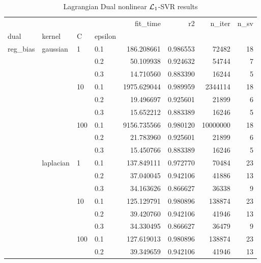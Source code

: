 \begin{table}[H]
\centering
\caption{Lagrangian Dual nonlinear $\protect \mathcal{L}_1$-SVR results}
\label{nonlinear_lagrangian_dual_l1_svr_cv_results}
\begin{tabular}{llllrrrr}
\toprule
           &           &     &     &     fit\_time &        r2 &    n\_iter &  n\_sv \\
dual & kernel & C & epsilon &              &           &           &       \\
\midrule
reg\_bias & gaussian & 1   & 0.1 &   186.208661 &  0.986553 &     72482 &    18 \\
           &           &     & 0.2 &    50.109938 &  0.924632 &     54744 &     7 \\
           &           &     & 0.3 &    14.710560 &  0.883390 &     16244 &     5 \\
           &           & 10  & 0.1 &  1975.629044 &  0.989959 &   2344114 &    18 \\
           &           &     & 0.2 &    19.496697 &  0.925601 &     21899 &     6 \\
           &           &     & 0.3 &    15.652212 &  0.883389 &     16246 &     5 \\
           &           & 100 & 0.1 &  9156.735566 &  0.980120 &  10000000 &    18 \\
           &           &     & 0.2 &    21.783960 &  0.925601 &     21899 &     6 \\
           &           &     & 0.3 &    15.450766 &  0.883389 &     16246 &     5 \\
           & laplacian & 1   & 0.1 &   137.849111 &  0.972770 &     70484 &    23 \\
           &           &     & 0.2 &    37.040045 &  0.942106 &     41886 &    13 \\
           &           &     & 0.3 &    34.163626 &  0.866627 &     36338 &     9 \\
           &           & 10  & 0.1 &   125.129791 &  0.980896 &    138874 &    23 \\
           &           &     & 0.2 &    39.420760 &  0.942106 &     41946 &    13 \\
           &           &     & 0.3 &    34.330495 &  0.866627 &     36479 &     9 \\
           &           & 100 & 0.1 &   127.619013 &  0.980896 &    138874 &    23 \\
           &           &     & 0.2 &    39.349659 &  0.942106 &     41946 &    13 \\

\end{tabular}
\end{table}
